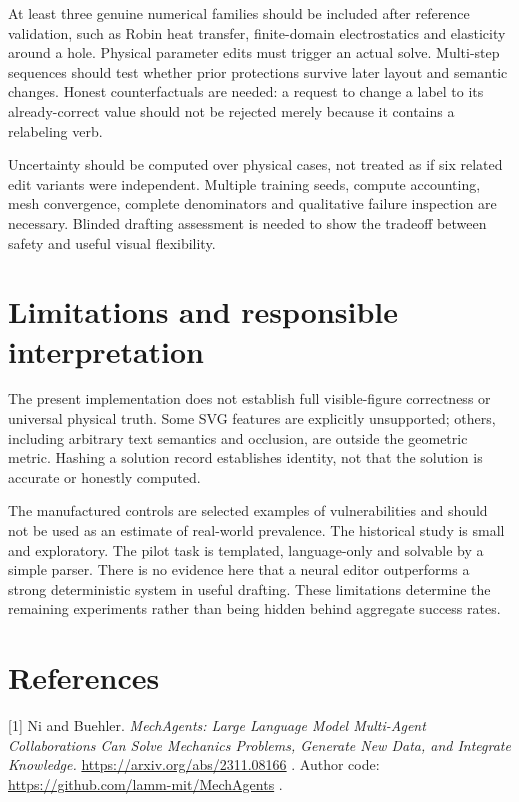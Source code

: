 \documentclass[
  11pt,
  a4paper,
]{article}
\begin{document}
At least three genuine numerical families should be included after
reference validation, such as Robin heat transfer, finite-domain
electrostatics and elasticity around a hole. Physical parameter edits
must trigger an actual solve. Multi-step sequences should test whether
prior protections survive later layout and semantic changes. Honest
counterfactuals are needed: a request to change a label to its
already-correct value should not be rejected merely because it contains
a relabeling verb.

Uncertainty should be computed over physical cases, not treated as if
six related edit variants were independent. Multiple training seeds,
compute accounting, mesh convergence, complete denominators and
qualitative failure inspection are necessary. Blinded drafting
assessment is needed to show the tradeoff between safety and useful
visual flexibility.

\section{Limitations and responsible
interpretation}\label{limitations-and-responsible-interpretation}

The present implementation does not establish full visible-figure
correctness or universal physical truth. Some SVG features are
explicitly unsupported; others, including arbitrary text semantics and
occlusion, are outside the geometric metric. Hashing a solution record
establishes identity, not that the solution is accurate or honestly
computed.

The manufactured controls are selected examples of vulnerabilities and
should not be used as an estimate of real-world prevalence. The
historical study is small and exploratory. The pilot task is templated,
language-only and solvable by a simple parser. There is no evidence here
that a neural editor outperforms a strong deterministic system in useful
drafting. These limitations determine the remaining experiments rather
than being hidden behind aggregate success rates.

\section{References}\label{references}

{[}1{]} Ni and Buehler. \emph{MechAgents: Large Language Model
Multi-Agent Collaborations Can Solve Mechanics Problems, Generate New
Data, and Integrate Knowledge.} \url{https://arxiv.org/abs/2311.08166} .
Author code: \url{https://github.com/lamm-mit/MechAgents} .
\end{document}
